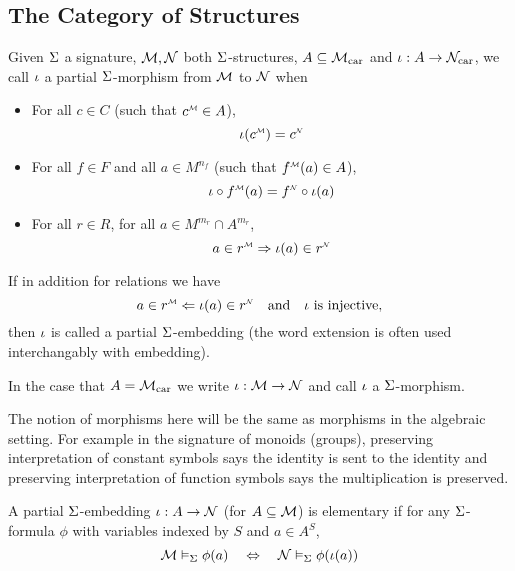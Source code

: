 \subsection{The Category of Structures}
\begin{dfn}
    Given $\Sigma$ a signature, 
    $\mathcal{M}, \mathcal{N}$ both $\Sigma$-structures, $A \subseteq {\mathcal{M}}_\mathrm{car}$
    and $\iota : A \to {\mathcal{N}}_\mathrm{car}$,
    we call $\iota$ a partial $\Sigma$-morphism from $\mathcal{M}$ to $\mathcal{N}$ when 
    \begin{itemize}
        \item For all $c \in C$ (such that $\mmintp{c} \in A$), 
        \[\io(\mmintp{c}) = \modintp{\NN}{c}\]
        \item For all $f \in F$ and all $a \in M^{n_f}$
        (such that $\mmintp{f}(a) \in A$), 
        \[\io \circ \mmintp{f}(a) = \modintp{\NN}{f} \circ \io(a)\]
        \item For all $r \in R$, for all $a \in M^{m_r} \cap A^{m_r}$,
        \[a \in \mmintp{r} \implies \io (a) \in \modintp{\NN}{r}\]
    \end{itemize}
    If in addition for relations we have
    \[a \in \mmintp{r} \limplies \io (a) \in \modintp{\NN}{r} \quad 
    \text{and} \quad \io \text { is injective,} \]
    then $\iota$ is called a partial $\Sigma$-embedding 
    (the word extension is often used interchangably with embedding). 

    In the case that $A = {\mathcal{M}}_\mathrm{car}$
    we write $\iota : \mathcal{M} \to \mathcal{N}$ and call $\iota$ a $\Sigma$-morphism.
\end{dfn}
The notion of morphisms here will be the same as 
morphisms in the algebraic setting.
For example in the signature of monoids (groups), 
preserving interpretation of constant symbols 
says the identity is sent to the identity 
and preserving interpretation of function symbols
says the multiplication is preserved.

\begin{dfn}
    A partial $\Sigma$-embedding $\iota : A \to \mathcal{N}$ (for $A \subseteq \mathcal{M}$)
    is elementary if for any $\Sigma$-formula $\phi$
    with variables indexed by $S$
    and $a \in A^S$,
    \[
        \mathcal{M} \vDash_{\Sigma} \phi(a) \quad \Leftrightarrow \quad \mathcal{N} \vDash_{\Sigma} \phi(\iota(a))
    \]
\end{dfn}


